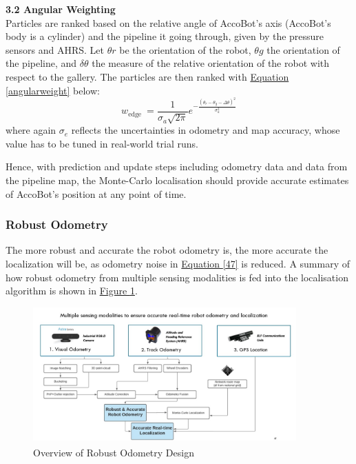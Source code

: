 \documentclass[11pt]{article}		%
\newcommand{\supercite}[1]{\textsuperscript{\cite{#1}}}		%
\newcommand{\figref}[1]{\hyperref[#1]{Figure \ref*{#1}}}    %
\newcommand{\equationref}[1]{\hyperref[#1]{Equation \ref*{#1}}}     %
\begin{document}
    \textbf{3.2 Angular Weighting}
    \\Particles are ranked based on the relative angle of AccoBot's axis (AccoBot's body is a cylinder) and the pipeline it going through, given by the pressure sensors and AHRS. Let $\theta r$ be the orientation of the robot, $\theta g$ the orientation of the pipeline, and $\delta \theta$ the measure of the relative orientation of the robot with respect to the gallery. The particles are then ranked with \equationref{angularweight} below:
    \begin{equation}
w_{\text {edge }}=\frac{1}{\sigma_{a} \sqrt{2 \pi}} e^{-\frac{\left(\theta_{r}-\theta_{g}-\Delta \theta\right)^{2}}{\sigma_{a}^{2}}}\label{angularweight}
\end{equation}
	 where again $\sigma_e$ reflects the uncertainties in odometry and map accuracy, whose value has to be tuned in real-world trial runs. 
	 
	 Hence, with prediction and update steps including odometry data and data from the pipeline map, the Monte-Carlo localisation should provide accurate estimates of AccoBot's position at any point of time.
	 
	\subsubsection{Robust Odometry}
	The more robust and accurate the robot odometry is, the more accurate the localization will be, as odometry noise in \equationref{47} is reduced. A summary of how robust odometry from multiple sensing modalities is fed into the localisation algorithm is shown in \figref{localisationChart}.  
										\begin{figure}[h]
				\centering
				\includegraphics[width=0.9\textwidth]{robustodometry.jpg}
				\caption{Overview of Robust Odometry Design \supercite{ELFTransmitter}}
				\label{localisationChart}
			\end{figure}
			
\end{document}
